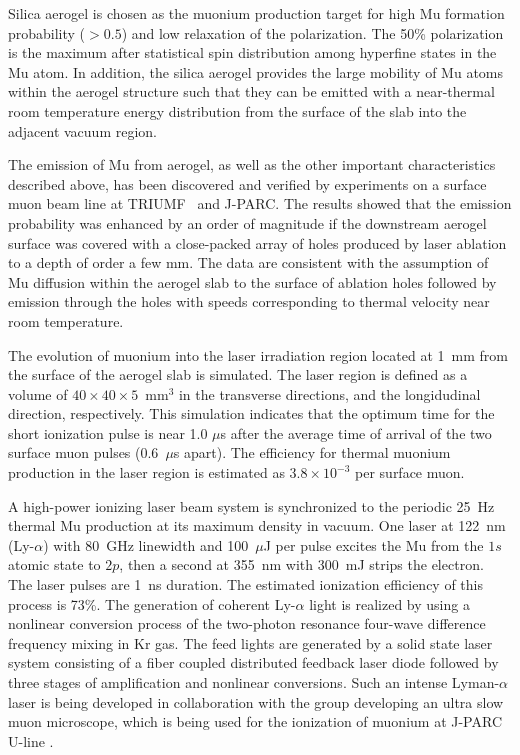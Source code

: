Silica aerogel is chosen as the muonium production target for
high Mu formation probability ($>0.5$) and low
relaxation of the polarization.
The 50\% polarization is the maximum after statistical spin
distribution among hyperfine states in the Mu atom.
In addition, the silica aerogel provides the large mobility of
Mu atoms within the aerogel structure such that they can be
emitted with a near-thermal room temperature energy distribution
from the surface of the slab into the adjacent vacuum region.

The emission of Mu from aerogel, as well as the other important
characteristics described above, has been discovered and verified by experiments
on a surface muon beam line at TRIUMF~\cite{Bakule:2013poa,Beer:2014ooa} and J-PARC.
The results showed that the
emission probability was enhanced by an order of magnitude if the
downstream aerogel surface was covered with a close-packed array of holes
produced by laser ablation to a depth of order a few mm. 
The data are consistent with the assumption of Mu diffusion 
within the aerogel slab to the surface of ablation holes 
followed by emission through the holes 
with speeds corresponding to thermal velocity near
room temperature.

The evolution of muonium into the laser irradiation region
located at 1~mm from the surface of the aerogel slab is simulated.
The laser region is defined as a volume of $40\times 40\times 5$~mm$^3$ in the transverse directions,
and the longidudinal direction, respectively.
This simulation indicates that the optimum time for the
short ionization pulse is near 1.0 $\mu$s after the
average time of arrival of the two surface muon pulses (0.6~$\mu$s apart).
The efficiency for thermal muonium production in the laser region 
is estimated as $3.8\times 10^{-3}$ per surface muon.

A high-power ionizing laser beam system is synchronized to the
periodic 25~Hz thermal Mu production at its maximum density in vacuum.
One laser at 122~nm (Ly-$\alpha$) with 80~GHz linewidth and 100~$\mu$J per pulse excites the Mu from the $1s$ atomic state
to $2p$, then a second at 355~nm with 300~mJ strips the electron. The
laser pulses are 1~ns duration. The estimated ionization efficiency of this process is 73\%.
The generation of coherent Ly-$\alpha$ light is realized by using a nonlinear conversion process 
of the two-photon resonance four-wave difference frequency mixing in Kr gas.
The feed lights are generated by a solid state laser system consisting of 
a fiber coupled distributed feedback laser diode followed by
three stages of amplification and nonlinear conversions.
Such an intense Lyman-$\alpha$ laser \cite{laser:2016} is being developed 
in collaboration with the group developing an ultra slow muon microscope, which 
is being used for the ionization of muonium at J-PARC U-line \cite{usm:2018}. 


